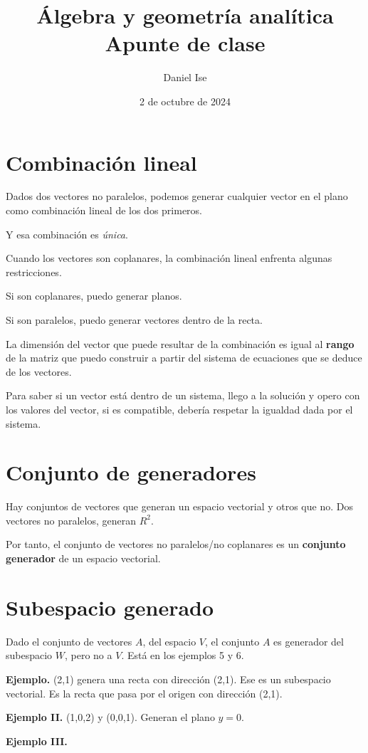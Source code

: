 \documentclass[12pt]{article}
\title{Álgebra y geometría analítica\\Apunte de clase}
\author{Daniel Ise}
\date{2 de octubre de 2024}
\begin{document}
\maketitle

\tableofcontents

\section{Combinación lineal}

Dados dos vectores no paralelos,
podemos generar cualquier vector en el plano
como combinación lineal de los dos primeros.

Y esa combinación es \textit{única}.

Cuando los vectores son coplanares, 
la combinación lineal enfrenta algunas restricciones.

Si son coplanares, puedo generar planos.

Si son paralelos, puedo generar vectores dentro de la recta.

La dimensión del vector que puede resultar de la combinación
es igual al \textbf{rango} de la matriz que puedo construir
a partir del sistema de ecuaciones que se deduce de los 
vectores.

Para saber si un vector está dentro de un sistema,
llego a la solución y opero con los valores del vector,
si es compatible,
debería respetar la igualdad dada por el sistema.

\section{Conjunto de generadores}

Hay conjuntos de vectores que generan un espacio vectorial y otros que no.
Dos vectores no paralelos, generan \(R^{2}\).

Por tanto,
el conjunto de vectores no paralelos/no coplanares es un 
\textbf{conjunto generador} de un espacio vectorial.

\section{Subespacio generado}

Dado el conjunto de vectores \(A\),
del espacio \(V\),
el conjunto \(A\) es generador del subespacio \(W\),
pero no a \(V\).
Está en los ejemplos 5 y 6.

\textbf{Ejemplo.}
(2,1) genera una recta con dirección (2,1).
Ese es un subespacio vectorial.
Es la recta que pasa por el origen con dirección (2,1).

\textbf{Ejemplo II.}
(1,0,2) y (0,0,1). Generan el plano \(y = 0\).

\textbf{Ejemplo III.}
\end{document}
